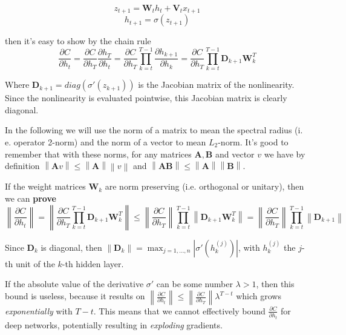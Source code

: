 \documentclass{article} %
\newcommand{\matr}[1]{\mathbf{#1}}
\newcommand\norm[1]{\left\lVert#1\right\rVert}
\begin{document}
\begin{equation}
  z_{t+1} = \matr{W}_t h_t + \matr{V}_t x_{t+1}
\end{equation}
\begin{equation}
  h_{t+1} = \sigma (z_{t+1})
\end{equation}

then it's easy to show by the chain rule
\begin{equation}
  \frac{\partial C}{\partial h_t} = \frac{\partial C}{\partial h_T} \frac{\partial h_T}{\partial h_t} = \frac{\partial C}{\partial h_T} \prod_{k=t}^{T-1} \frac{\partial h_{k+1}}{\partial h_k} = \frac{\partial C}{\partial h_T} \prod_{k=t}^{T-1} \matr{D}_{k+1} \matr{W}_k^T
\end{equation}

Where $\matr{D}_{k+1} = diag(\sigma'(z_{k+1}))$ is the Jacobian matrix of the nonlinearity. Since the nonlinearity is evaluated pointwise, this Jacobian matrix is clearly diagonal.

In the following we will use the norm of a matrix to mean the spectral radius (i. e. operator 2-norm) and the norm of a vector to mean $L_2$-norm. It's good to remember that with these norms, for any matrices $\matr{A}, \matr{B}$ and vector $v$ we have by definition $\norm{\matr{A}v} \leq \norm{\matr{A}} \norm{v}$ and $\norm{\matr{A}\matr{B}} \leq \norm{\matr{A}} \norm{\matr{B}}$.

If the weight matrices $\matr{W}_k$ are norm preserving (i.e. orthogonal or unitary), then we can {\bf{prove}}
\begin{equation}
  \norm{ \frac{\partial C}{\partial h_t} } = \norm{ \frac{\partial C}{\partial h_T} \prod_{k=t}^{T-1} \matr{D}_{k+1} \matr{W}_k^T } \leq \norm{\frac{\partial C}{\partial h_T}} \prod_{k=t}^{T-1} \norm{ \matr{D}_{k+1} \matr{W}_k^T } = \norm{ \frac{\partial C}{\partial h_T}} \prod_{k=t}^{T-1} \norm{\matr{D}_{k+1}}
\end{equation}

Since $\matr{D}_k$ is diagonal, then $\norm{\matr{D}_k} = \max_{j=1, ..., n} |\sigma'(h_k^{(j)})|$, with $h_k^{(j)}$ the $j$-th unit of the $k$-th hidden layer.

If the absolute value of the derivative $\sigma'$ can be some number $\lambda > 1$, then this bound is useless, because it results on $\norm{\frac{\partial C}{\partial h_t}} \leq \norm{\frac{\partial C}{\partial h_T}} \lambda^{T-t}$ which grows {\it{exponentially}} with $T-t$. This means that we cannot effectively bound $\frac{\partial C}{\partial h_t}$ for deep networks, potentially resulting in {\it{exploding}} gradients.
\end{document}
